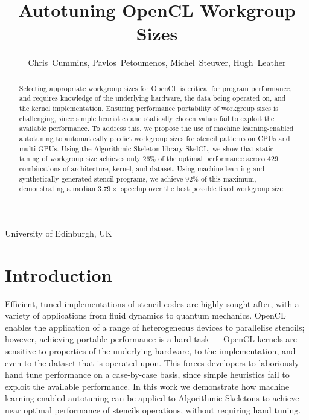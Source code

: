 \documentclass[hidelinks]{acaces}
\begin{document}
\title{Autotuning OpenCL Workgroup Sizes}

\author{
Chris~Cummins,
Pavlos~Petoumenos,
Michel~Steuwer,
Hugh~Leather
}

\address{1}{
University of Edinburgh,
UK
}

%

\pagestyle{empty}


\begin{abstract}
  Selecting appropriate workgroup sizes for OpenCL is critical for
  program performance, and requires knowledge of the underlying
  hardware, the data being operated on, and the kernel
  implementation. Ensuring performance portability of workgroup sizes
  is challenging, since simple heuristics and statically chosen values
  fail to exploit the available performance. To address this, we
  propose the use of machine learning-enabled autotuning to
  automatically predict workgroup sizes for stencil patterns on CPUs
  and multi-GPUs. Using the Algorithmic Skeleton library SkelCL, we
  show that static tuning of workgroup size achieves only $26\%$ of
  the optimal performance across 429 combinations of architecture,
  kernel, and dataset. Using machine learning and synthetically
  generated stencil programs, we achieve $92\%$ of this maximum,
  demonstrating a median $3.79\times$ speedup over the best possible
  fixed workgroup size.
\end{abstract}

\vspace{-.5em}

\vspace{-2em}
\section{Introduction}

Efficient, tuned implementations of stencil codes are highly sought
after, with a variety of applications from fluid dynamics to quantum
mechanics. OpenCL enables the application of a range of heterogeneous
devices to parallelise stencils; however, achieving portable
performance is a hard task --- OpenCL kernels are sensitive to
properties of the underlying hardware, to the implementation, and even
to the dataset that is operated upon. This forces developers to
laboriously hand tune performance on a case-by-case basis, since
simple heuristics fail to exploit the available performance. In this
work we demonstrate how machine learning-enabled autotuning can be
applied to Algorithmic Skeletons to achieve near optimal performance
of stencils operations, without requiring hand tuning.
\end{document}

